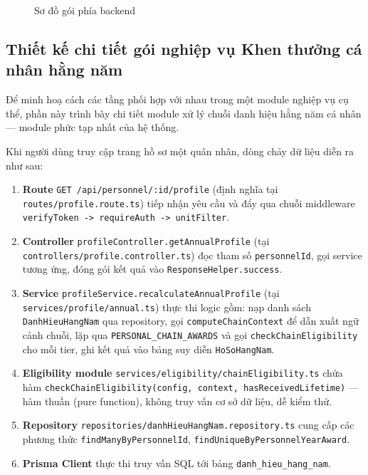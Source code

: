 \documentclass[../DoAn.tex]{subfiles}
\begin{document}
\begin{figure}[H]
    \centering
    \caption{Sơ đồ gói phía backend}
    \label{fig:goi-backend}
\end{figure}

\subsection{Thiết kế chi tiết gói nghiệp vụ Khen thưởng cá nhân hằng năm}
\label{subsection:4.1.4}

Để minh hoạ cách các tầng phối hợp với nhau trong một module nghiệp vụ cụ thể, phần này trình bày chi tiết module xử lý chuỗi danh hiệu hằng năm cá nhân --- module phức tạp nhất của hệ thống.

Khi người dùng truy cập trang hồ sơ một quân nhân, dòng chảy dữ liệu diễn ra như sau:

\begin{enumerate}
    \item \textbf{Route} \texttt{GET /api/personnel/:id/profile} (định nghĩa tại \texttt{routes/profile.route.ts}) tiếp nhận yêu cầu và đẩy qua chuỗi middleware \texttt{verifyToken -> requireAuth -> unitFilter}.
    \item \textbf{Controller} \texttt{profileController.getAnnualProfile} (tại \texttt{controllers/profile.controller.ts}) đọc tham số \texttt{personnelId}, gọi service tương ứng, đóng gói kết quả vào \texttt{ResponseHelper.success}.
    \item \textbf{Service} \texttt{profileService.recalculateAnnualProfile} (tại \texttt{services/profile/annual.ts}) thực thi logic gồm: nạp danh sách \texttt{DanhHieuHangNam} qua repository, gọi \texttt{computeChainContext} để dẫn xuất ngữ cảnh chuỗi, lặp qua \texttt{PERSONAL\_CHAIN\_AWARDS} và gọi \texttt{checkChainEligibility} cho mỗi tier, ghi kết quả vào bảng suy diễn \texttt{HoSoHangNam}.
    \item \textbf{Eligibility module} \texttt{services/eligibility/chainEligibility.ts} chứa hàm \texttt{checkChainEligibility(config, context, hasReceivedLifetime)} --- hàm thuần (pure function), không truy vấn cơ sở dữ liệu, dễ kiểm thử.
    \item \textbf{Repository} \texttt{repositories/danhHieuHangNam.repository.ts} cung cấp các phương thức \texttt{findManyByPersonnelId}, \texttt{findUniqueByPersonnelYearAward}.
    \item \textbf{Prisma Client} thực thi truy vấn SQL tới bảng \texttt{danh\_hieu\_hang\_nam}.
\end{enumerate}
\end{document}
